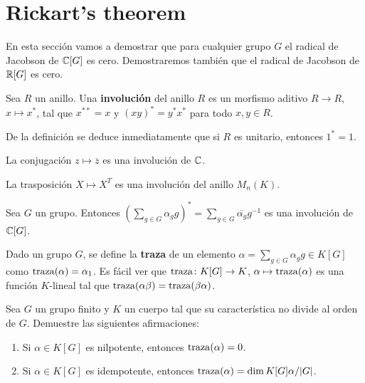 \section*{Rickart's theorem}

En esta sección vamos a demostrar que para cualquier grupo $G$ el radical de
Jacobson de $\mathbb{C}[G]$ es cero. Demostraremos también que el radical de Jacobson
de $\mathbb{R}[G]$ es cero.

\begin{definition}
	Sea $R$ un anillo. Una \textbf{involución} del anillo $R$ es un morfismo
	aditivo $R\to R$, $x\mapsto x^*$, tal que $x^{**}=x$ y $(xy)^*=y^*x^*$ para
	todo $x,y\in R$.
\end{definition}

De la definición se deduce inmediatamente que si $R$ es unitario, entonces
$1^*=1$.

\begin{example}
	La conjugación $z\mapsto\overline{z}$ es una involución de $\mathbb{C}$.
\end{example}

\begin{example}
	La trasposición $X\mapsto X^T$ es una involución del
	anillo $M_n(K)$.
\end{example}

\begin{example}
	Sea $G$ un grupo. Entonces
	$\left(\sum_{g\in G}\alpha_gg\right)^*=\sum_{g\in G}\overline{\alpha_g}g^{-1}$ 
	es una involución de $\mathbb{C}[G]$.
\end{example}

Dado un grupo $G$, se define la \textbf{traza} de un elemento
$\alpha=\sum_{g\in G}\alpha_gg\in K[G]$ como $\operatorname{traza}(\alpha)=\alpha_1$. Es
fácil ver que $\operatorname{traza}\colon K[G]\to K$, $\alpha\mapsto\operatorname{traza}(\alpha)$ es una
función $K$-lineal tal que $\operatorname{traza}(\alpha\beta)=\operatorname{traza}(\beta\alpha)$.

\begin{exercise}
	Sea $G$ un grupo finito y $K$ un cuerpo tal que su característica no divide al orden de $G$.
	Demuestre las siguientes afirmaciones:
	\begin{enumerate}
		\item Si $\alpha\in K[G]$ es nilpotente, entonces $\operatorname{traza}(\alpha)=0$.
		\item Si $\alpha\in K[G]$ es idempotente, entonces $\operatorname{traza}(\alpha)=\dim
			K[G]\alpha/|G|$.
	\end{enumerate}
\end{exercise}

